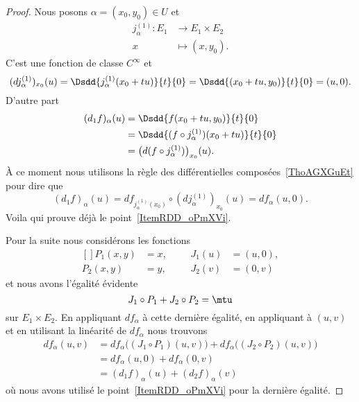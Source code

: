 \begin{proof}
    Nous posons \( \alpha=(x_0,y_0)\in U\) et
    \begin{equation}
        \begin{aligned}
            j_{\alpha}^{(1)}\colon E_1&\to E_1\times E_2 \\
            x&\mapsto (x,y_0).
        \end{aligned}
    \end{equation}
    C'est une fonction de classe \(  C^{\infty}\) et
    \begin{equation}
        (dj_{\alpha}^{(1)})_{x_0}(u)=\Dsdd{ j_{\alpha}^{(1)}(x_0+tu) }{t}{0}=\Dsdd{ (x_0+tu,y_0) }{t}{0}=(u,0).
    \end{equation}
    D'autre part
    \begin{subequations}
        \begin{align}
            (d_1f)_{\alpha}(u)&=\Dsdd{ f(x_0+tu,y_0) }{t}{0}\\
            &=\Dsdd{ (f\circ j_{\alpha}^{(1)})(x_0+tu) }{t}{0}\\
            &=\big( d(f\circ j_{\alpha}^{(1)}) \big)_{x_0}(u).
        \end{align}
    \end{subequations}
    À ce moment nous utilisons la règle des différentielles composées~\ref{ThoAGXGuEt} pour dire que
    \begin{equation}
        (d_1f)_{\alpha}(u)=df_{j_{\alpha}^{(1)}(x_0)}\circ (dj_{\alpha}^{(1)})_{x_0}(u)=df_{\alpha}(u,0).
    \end{equation}
    Voila qui prouve déjà le point~\ref{ItemRDD_oPmXVi}.

    Pour la suite nous considérons les fonctions
    \begin{equation}
        \begin{aligned}[]
            P_1(x,y)&=x,&&&J_1(u)&=(u,0),\\
            P_2(x,y)&=y,&&&J_2(v)&=(0,v)
        \end{aligned}
    \end{equation}
    et nous avons l'égalité évidente
    \begin{equation}
        J_1\circ P_1+J_2\circ P_2=\mtu
    \end{equation}
    sur \( E_1\times E_2\). En appliquant \( df_{\alpha}\) à cette dernière égalité, en appliquant à \( (u,v)\) et en utilisant la linéarité de \( df_{\alpha}\) nous trouvons
    \begin{subequations}
        \begin{align}
            df_{\alpha}(u,v)&=df_{\alpha}\big( (J_1\circ P_1)(u,v) \big)+df_{\alpha}\big( (J_2\circ P_2)(u,v) \big)\\
            &=df_{\alpha}(u,0)+df_{\alpha}(0,v)\\
            &=(d_1f)_{\alpha}(u)+(d_2f)_{\alpha}(v)
        \end{align}
    \end{subequations}
    où nous avons utilisé le point~\ref{ItemRDD_oPmXVi} pour la dernière égalité.
\end{proof}

